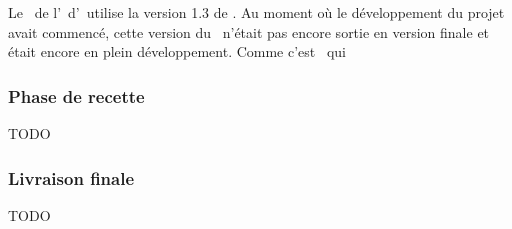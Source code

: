 Le \alotdeux\ de l'\aintranet\ d'\aey\ utilise la version 1.3 de \asf. Au moment où le développement du projet avait commencé, cette version du \afm\ n'était pas encore sortie en version finale et était encore en plein développement. Comme c'est \asl\ qui 


\subsubsection{Phase de recette}

TODO


\subsubsection{Livraison finale}

TODO



